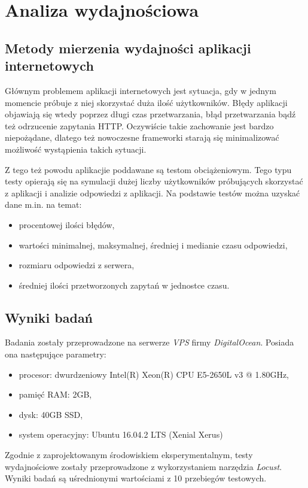 \chapter{Analiza wydajnościowa}

\section{Metody mierzenia wydajności aplikacji internetowych}
Głównym problemem aplikacji internetowych jest sytuacja, gdy w jednym momencie próbuje z niej skorzystać duża ilość użytkowników. Błędy aplikacji objawiają się wtedy poprzez długi czas przetwarzania, błąd przetwarzania bądź też odrzucenie zapytania HTTP. Oczywiście takie zachowanie jest bardzo niepożądane, dlatego też nowoczesne frameworki starają się minimalizować możliwość wystąpienia takich sytuacji.

Z tego też powodu aplikacjie poddawane są testom obciążeniowym. Tego typu testy opierają się na symulacji dużej liczby użytkowników próbujących skorzystać z aplikacji i analizie odpowiedzi z aplikacji. Na podstawie testów można uzyskać dane m.in. na temat:
\begin{itemize}
  \item procentowej ilości błędów,
  \item wartości minimalnej, maksymalnej, średniej i medianie czasu odpowiedzi,
  \item rozmiaru odpowiedzi z serwera,
  \item średniej ilości przetworzonych zapytań w jednostce czasu.
\end{itemize}


\section{Wyniki badań}
Badania zostały przeprowadzone na serwerze \emph{VPS} firmy \emph{DigitalOcean}. Posiada ona następujące parametry:
\begin{itemize}
  \item procesor: dwurdzeniowy Intel(R) Xeon(R) CPU E5-2650L v3 @ 1.80GHz,
  \item pamięć RAM: 2GB,
  \item dysk: 40GB SSD,
  \item system operacyjny: Ubuntu 16.04.2 LTS (Xenial Xerus)
\end{itemize}

Zgodnie z zaprojektowanym środowiskiem eksperymentalnym, testy wydajnościowe zostały przeprowadzone z wykorzystaniem narzędzia \emph{Locust}. Wyniki badań są uśrednionymi wartościami z 10 przebiegów testowych.

